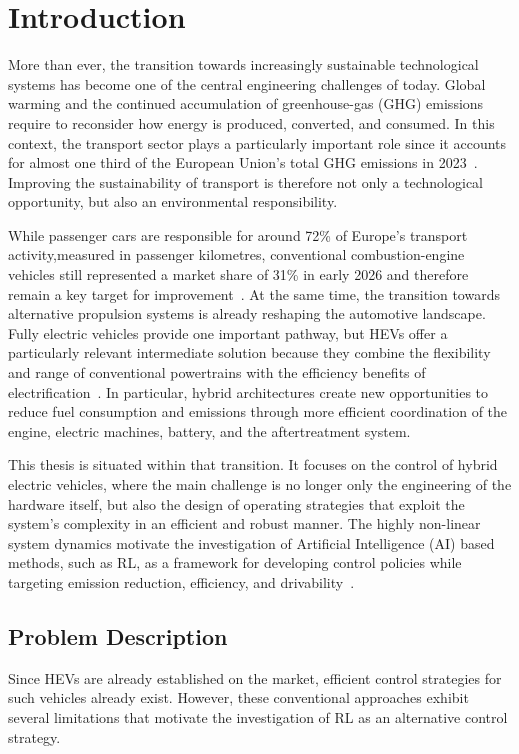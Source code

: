\chapter{Introduction}
\label{chap:introduction}
More than ever, the transition towards increasingly sustainable technological systems has become one of the central engineering challenges of today. Global warming and the continued accumulation of greenhouse-gas (GHG) emissions require to reconsider how energy is produced, converted, and consumed. In this context, the transport sector plays a particularly important role since it accounts for almost one third of the European Union's total GHG emissions in 2023~\cite{european_environment_agency_sustainability_2026}. Improving the sustainability of transport is therefore not only a technological opportunity, but also an environmental responsibility.

While passenger cars are responsible for around 72\% of Europe's transport activity,measured in passenger kilometres, conventional combustion-engine vehicles still represented a market share of 31\% in early 2026 and therefore remain a key target for improvement~\cite{european_environment_agency_sustainability_2026, icct_-_international_council_on_clean_transportation_european_nodate}. At the same time, the transition towards alternative propulsion systems is already reshaping the automotive landscape. Fully electric vehicles provide one important pathway, but \acp{HEV} offer a particularly relevant intermediate solution because they combine the flexibility and range of conventional powertrains with the efficiency benefits of electrification~\cite{enang_modelling_2017, garcia_life_2022}. In particular, hybrid architectures create new opportunities to reduce fuel consumption and emissions through more efficient coordination of the engine, electric machines, battery, and the aftertreatment system.

This thesis is situated within that transition. It focuses on the control of hybrid electric vehicles, where the main challenge is no longer only the engineering of the hardware itself, but also the design of operating strategies that exploit the system's complexity in an efficient and robust manner. The highly non-linear system dynamics motivate the investigation of Artificial Intelligence (AI) based methods, such as \ac{RL}, as a framework for developing control policies while targeting emission reduction, efficiency, and drivability~\cite{frey_data-based_2025, wang_energy_2025}.

\section{Problem Description}
\label{sec:problem_description}
Since HEVs are already established on the market, efficient control strategies for such vehicles already exist. However, these conventional approaches exhibit several limitations that motivate the investigation of \ac{RL} as an alternative control strategy.

